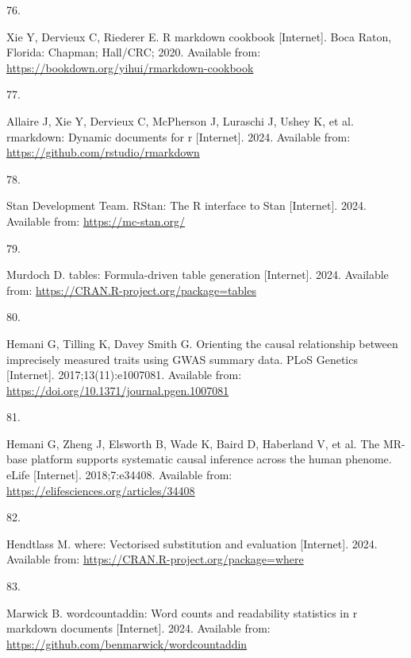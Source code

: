 \documentclass[
]{article}
\newlength{\cslhangindent}
\newlength{\csllabelwidth}
\newenvironment{CSLReferences}[2] %
 {\begin{list}{}{%
  \setlength{\itemindent}{0pt}
  \setlength{\leftmargin}{0pt}
  \setlength{\parsep}{0pt}
  \ifodd #1
   \setlength{\leftmargin}{\cslhangindent}
   \setlength{\itemindent}{-1\cslhangindent}
  \fi
  \setlength{\itemsep}{#2\baselineskip}}}
 {\end{list}}
\newcommand{\CSLLeftMargin}[1]{\parbox[t]{\csllabelwidth}{\strut#1\strut}}
\newcommand{\CSLRightInline}[1]{\parbox[t]{\linewidth - \csllabelwidth}{\strut#1\strut}}
\begin{document}
\begin{CSLReferences}{0}{1}
\CSLLeftMargin{76. }%
\CSLRightInline{Xie Y, Dervieux C, Riederer E. R markdown cookbook {[}Internet{]}. Boca Raton, Florida: Chapman; Hall/CRC; 2020. Available from: \url{https://bookdown.org/yihui/rmarkdown-cookbook}}

\CSLLeftMargin{77. }%
\CSLRightInline{Allaire J, Xie Y, Dervieux C, McPherson J, Luraschi J, Ushey K, et al. {rmarkdown}: Dynamic documents for r {[}Internet{]}. 2024. Available from: \url{https://github.com/rstudio/rmarkdown}}

\CSLLeftMargin{78. }%
\CSLRightInline{Stan Development Team. {RStan}: The {R} interface to {Stan} {[}Internet{]}. 2024. Available from: \url{https://mc-stan.org/}}

\CSLLeftMargin{79. }%
\CSLRightInline{Murdoch D. {tables}: Formula-driven table generation {[}Internet{]}. 2024. Available from: \url{https://CRAN.R-project.org/package=tables}}

\CSLLeftMargin{80. }%
\CSLRightInline{Hemani G, Tilling K, Davey Smith G. Orienting the causal relationship between imprecisely measured traits using GWAS summary data. PLoS Genetics {[}Internet{]}. 2017;13(11):e1007081. Available from: \url{https://doi.org/10.1371/journal.pgen.1007081}}

\CSLLeftMargin{81. }%
\CSLRightInline{Hemani G, Zheng J, Elsworth B, Wade K, Baird D, Haberland V, et al. The MR-base platform supports systematic causal inference across the human phenome. eLife {[}Internet{]}. 2018;7:e34408. Available from: \url{https://elifesciences.org/articles/34408}}

\CSLLeftMargin{82. }%
\CSLRightInline{Hendtlass M. {where}: Vectorised substitution and evaluation {[}Internet{]}. 2024. Available from: \url{https://CRAN.R-project.org/package=where}}

\CSLLeftMargin{83. }%
\CSLRightInline{Marwick B. {wordcountaddin}: Word counts and readability statistics in r markdown documents {[}Internet{]}. 2024. Available from: \url{https://github.com/benmarwick/wordcountaddin}}

\end{CSLReferences}

\newpage

\appendix
\end{document}
